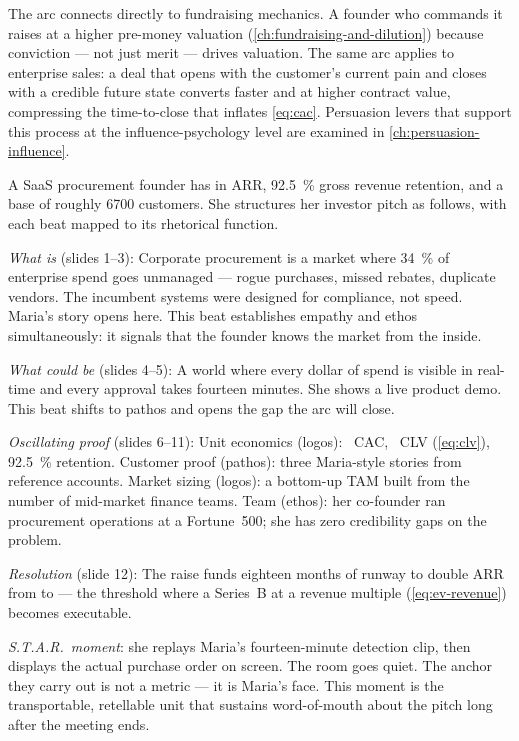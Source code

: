 The arc connects directly to fundraising mechanics. A founder who commands it raises at a
higher pre-money valuation (\cref{ch:fundraising-and-dilution}) because conviction — not
just merit — drives valuation. The same arc applies to enterprise sales: a deal that opens
with the customer's current pain and closes with a credible future state converts faster
and at higher contract value, compressing the time-to-close that inflates \cref{eq:cac}.
Persuasion levers that support this process at the influence-psychology level are examined
in \cref{ch:persuasion-influence}.

\begin{example}
A SaaS procurement founder has  in ARR, \qty{92.5}{\percent} gross revenue
retention, and a base of roughly \num{6700} customers. She structures her investor pitch
as follows, with each beat mapped to its rhetorical function.

\emph{What is} (slides 1–3): Corporate procurement is a  market where
\qty{34}{\percent} of enterprise spend goes unmanaged — rogue purchases, missed rebates,
duplicate vendors. The incumbent systems were designed for compliance, not speed. Maria's
story opens here. This beat establishes empathy and ethos simultaneously: it signals that
the founder knows the market from the inside.

\emph{What could be} (slides 4–5): A world where every dollar of spend is visible in
real-time and every approval takes fourteen minutes. She shows a live product demo.
This beat shifts to pathos and opens the gap the arc will close.

\emph{Oscillating proof} (slides 6–11): Unit economics (logos): ~CAC,
~CLV (\cref{eq:clv}), \qty{92.5}{\percent} retention. Customer proof
(pathos): three Maria-style stories from reference accounts. Market sizing (logos): a
bottom-up TAM built from the number of mid-market finance teams. Team (ethos): her
co-founder ran procurement operations at a Fortune~500; she has zero credibility gaps on
the problem.

\emph{Resolution} (slide 12): The  raise funds eighteen months of runway
to double ARR from  to  — the threshold where a Series~B
at a revenue multiple (\cref{eq:ev-revenue}) becomes executable.

\emph{S.T.A.R.\ moment}: she replays Maria's fourteen-minute detection clip, then displays
the actual purchase order on screen. The room goes quiet. The anchor they carry out is
not a metric — it is Maria's face. This moment is the transportable, retellable unit that
sustains word-of-mouth about the pitch long after the meeting ends.
\end{example}

